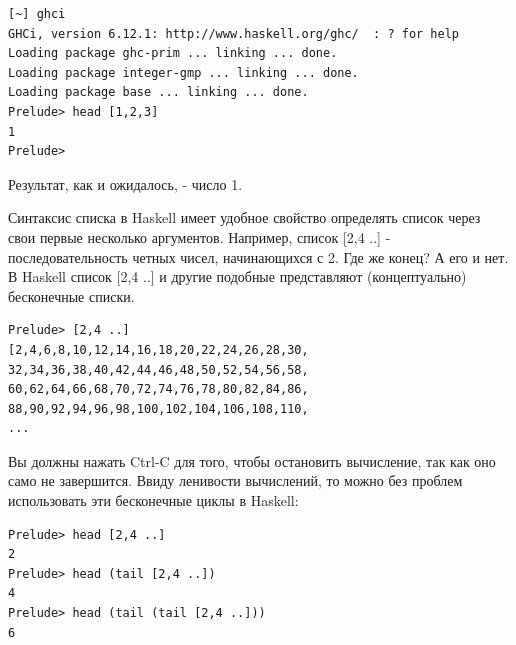\begin{scriptsize}\begin{verbatim}
[~] ghci
GHCi, version 6.12.1: http://www.haskell.org/ghc/  : ? for help
Loading package ghc-prim ... linking ... done.
Loading package integer-gmp ... linking ... done.
Loading package base ... linking ... done.
Prelude> head [1,2,3]
1
Prelude>
\end{verbatim}\end{scriptsize}


Результат, как и ожидалось, - число 1.


Синтаксис списка в Haskell имеет удобное свойство определять 
список через свои первые несколько аргументов. Например, 
список [2,4 ..] - последовательность четных чисел, начинающихся с 2. 
Где же конец? А его и нет. В Haskell список [2,4 ..] и другие подобные 
представляют (концептуально) бесконечные списки.   


\begin{scriptsize}\begin{verbatim}
Prelude> [2,4 ..]
[2,4,6,8,10,12,14,16,18,20,22,24,26,28,30,
32,34,36,38,40,42,44,46,48,50,52,54,56,58,
60,62,64,66,68,70,72,74,76,78,80,82,84,86,
88,90,92,94,96,98,100,102,104,106,108,110,
...
\end{verbatim}\end{scriptsize}


Вы должны нажать Ctrl-C для того, чтобы остановить вычисление, так 
как оно само не завершится. Ввиду ленивости вычислений, то можно без проблем 
использовать эти бесконечные циклы в Haskell:

\begin{scriptsize}\begin{verbatim}
Prelude> head [2,4 ..]
2
Prelude> head (tail [2,4 ..])
4
Prelude> head (tail (tail [2,4 ..]))
6
\end{verbatim}\end{scriptsize}


